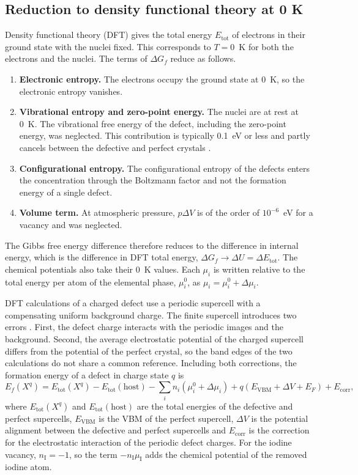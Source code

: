 \subsection{Reduction to density functional theory at 0 K}

Density functional theory (DFT) gives the total energy $E_\mathrm{tot}$ of electrons in their ground state with the nuclei fixed. This corresponds to $T = 0$~K for both the electrons and the nuclei. The terms of $\Delta G_f$ reduce as follows.
\begin{enumerate}
  \item \textbf{Electronic entropy.} The electrons occupy the ground state at 0~K, so the electronic entropy vanishes.
  \item \textbf{Vibrational entropy and zero-point energy.} The nuclei are at rest at 0~K. The vibrational free energy of the defect, including the zero-point energy, was neglected. This contribution is typically 0.1~eV or less and partly cancels between the defective and perfect crystals \citep{Freysoldt2014}.
  \item \textbf{Configurational entropy.} The configurational entropy of the defects enters the concentration through the Boltzmann factor and not the formation energy of a single defect.
  \item \textbf{Volume term.} At atmospheric pressure, $p\Delta V$ is of the order of $10^{-6}$~eV for a vacancy and was neglected.
\end{enumerate}
The Gibbs free energy difference therefore reduces to the difference in internal energy, which is the difference in DFT total energy, $\Delta G_f \rightarrow \Delta U = \Delta E_\mathrm{tot}$. The chemical potentials also take their 0~K values. Each $\mu_i$ is written relative to the total energy per atom of the elemental phase, $\mu_i^0$, as $\mu_i = \mu_i^0 + \Delta\mu_i$.

DFT calculations of a charged defect use a periodic supercell with a compensating uniform background charge. The finite supercell introduces two errors \citep{Freysoldt2009,Freysoldt2014}. First, the defect charge interacts with the periodic images and the background. Second, the average electrostatic potential of the charged supercell differs from the potential of the perfect crystal, so the band edges of the two calculations do not share a common reference. Including both corrections, the formation energy of a defect in charge state $q$ is
\begin{equation}
  E_f(X^q) = E_\mathrm{tot}(X^q) - E_\mathrm{tot}(\mathrm{host}) - \sum_i n_i \left(\mu_i^0 + \Delta\mu_i\right) + q\left(E_\mathrm{VBM} + \Delta V + E_F\right) + E_\mathrm{corr} ,
  \label{eq:Ef}
\end{equation}
where $E_\mathrm{tot}(X^q)$ and $E_\mathrm{tot}(\mathrm{host})$ are the total energies of the defective and perfect supercells, $E_\mathrm{VBM}$ is the VBM of the perfect supercell, $\Delta V$ is the potential alignment between the defective and perfect supercells and $E_\mathrm{corr}$ is the correction for the electrostatic interaction of the periodic defect charges. For the iodine vacancy, $n_\mathrm{I} = -1$, so the term $-n_\mathrm{I}\mu_\mathrm{I}$ adds the chemical potential of the removed iodine atom.

